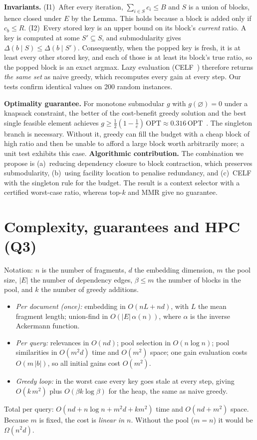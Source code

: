 \documentclass[10pt,a4paper]{article}
\newcommand{\cost}{c}
\begin{document}
\textbf{Invariants.}
(I1)~After every iteration, $\sum_{i\in S}\cost_i\le B$ and $S$ is a union of blocks, hence closed under $E$ by the Lemma. This holds because a block is added only if $\cost_b\le R$.
(I2)~Every stored key is an upper bound on its block's \emph{current} ratio. A key is computed at some $S'\subseteq S$, and submodularity gives $\Delta(b\mid S)\le\Delta(b\mid S')$.
Consequently, when the popped key is fresh, it is at least every other stored key, and each of those is at least its block's true ratio, so the popped block is an exact argmax. Lazy evaluation (CELF~\cite{leskovec2007}) therefore returns \emph{the same set} as naive greedy, which recomputes every gain at every step. Our tests confirm identical values on 200 random instances.

\textbf{Optimality guarantee.} For monotone submodular $g$ with $g(\varnothing)=0$ under a knapsack constraint, the better of the cost-benefit greedy solution and the best single feasible element achieves $g\ge\frac12(1-\frac1e)\,\mathrm{OPT}\approx0.316\,\mathrm{OPT}$~\cite{khuller1999,krause2005}. The singleton branch is necessary. Without it, greedy can fill the budget with a cheap block of high ratio and then be unable to afford a large block worth arbitrarily more; a unit test exhibits this case.
\textbf{Algorithmic contribution.} The combination we propose is (a)~reducing dependency closure to block contraction, which preserves submodularity, (b)~using facility location to penalise redundancy, and (c)~CELF with the singleton rule for the budget. The result is a context selector with a certified worst-case ratio, whereas top-$k$ and MMR give no guarantee.

\section{Complexity, guarantees and HPC (Q3)}

Notation: $n$ is the number of fragments, $d$ the embedding dimension, $m$ the pool size, $|E|$ the number of dependency edges, $\beta\le m$ the number of blocks in the pool, and $k$ the number of greedy additions.
\begin{itemize}
\item \emph{Per document (once):} embedding in $O(nL+nd)$, with $L$ the mean fragment length; union-find in $O(|E|\,\alpha(n))$, where $\alpha$ is the inverse Ackermann function.
\item \emph{Per query:} relevances in $O(nd)$; pool selection in $O(n\log n)$; pool similarities in $O(m^2d)$ time and $O(m^2)$ space; one gain evaluation costs $O(m\,|b|)$, so all initial gains cost $O(m^2)$.
\item \emph{Greedy loop:} in the worst case every key goes stale at every step, giving $O(k\,m^2)$ plus $O(\beta k\log\beta)$ for the heap, the same as naive greedy.
\end{itemize}
Total per query: $O(nd+n\log n+m^2d+km^2)$ time and $O(nd+m^2)$ space. Because $m$ is fixed, the cost is \emph{linear in $n$}. Without the pool ($m=n$) it would be $\Omega(n^2d)$.
\end{document}
